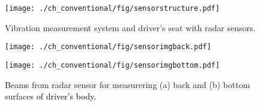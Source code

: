 \begin{figure}[!t]
\centering
\texttt{[image: ./ch\_conventional/fig/sensorstructure.pdf]}
\caption{Vibration measurement system and driver's seat with radar sensors.}
\label{fig:sensorstructure}
\end{figure}

\begin{figure}[htbp]
      \begin{minipage}[t]{0.45\hsize}
        \centering
        \texttt{[image: ./ch\_conventional/fig/sensorimgback.pdf]}
        \label{fig:sensorimgback}
      \end{minipage} 
      \begin{minipage}[t]{0.45\hsize}
        \centering
        \texttt{[image: ./ch\_conventional/fig/sensorimgbottom.pdf]}
        \label{fig:sensorimgbottom}
      \end{minipage} 
     \caption{Beams from radar sensor for measurering (a) back and (b) bottom surfaces \textcolor{black}{of driver's body}.}
     \label{fig:sensorimg}
  \end{figure}


